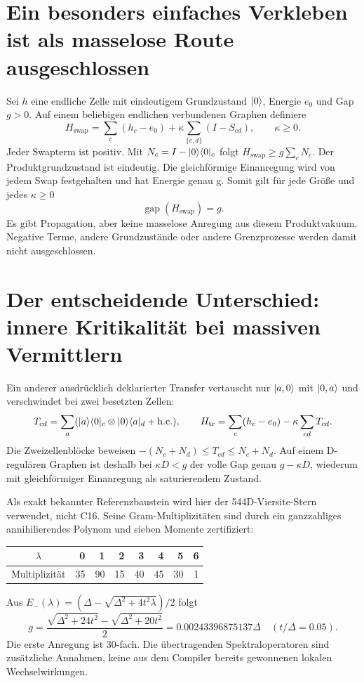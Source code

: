 \section{Ein besonders einfaches Verkleben ist als masselose Route ausgeschlossen}
Sei $h$ eine endliche Zelle mit eindeutigem Grundzustand $\lvert0\rangle$, Energie $e_0$ und Gap $g>0$. Auf einem beliebigen endlichen verbundenen Graphen definiere
\[
H_\mathrm{swap}=\sum_c(h_c-e_0)+\kappa\sum_{\{c,d\}}(I-S_{cd}),\qquad\kappa\ge0.
\]
Jeder Swapterm ist positiv. Mit $N_c=I-\lvert0\rangle\langle0\rvert_c$ folgt $H_\mathrm{swap}\ge g\sum_cN_c$. Der Produktgrundzustand ist eindeutig. Die gleichförmige Einanregung wird von jedem Swap festgehalten und hat Energie genau g. Somit gilt für jede Größe und jedes $\kappa\ge0$
\[
\boxed{\operatorname{gap}(H_\mathrm{swap})=g.}
\]
Es gibt Propagation, aber keine masselose Anregung aus diesem Produktvakuum. Negative Terme, andere Grundzustände oder andere Grenzprozesse werden damit nicht ausgeschlossen.

\section{Der entscheidende Unterschied: innere Kritikalität bei massiven Vermittlern}
Ein anderer ausdrücklich deklarierter Transfer vertauscht nur $\lvert a,0\rangle$ mit $\lvert0,a\rangle$ und verschwindet bei zwei besetzten Zellen:
\[
T_{cd}=\sum_a(\lvert a\rangle\langle0\rvert_c\otimes\lvert0\rangle\langle a\rvert_d+\mathrm{h.c.}),
\qquad H_\mathrm{tr}=\sum_c(h_c-e_0)-\kappa\sum_{cd}T_{cd}.
\]
Die Zweizellenblöcke beweisen $-(N_c+N_d)\le T_{cd}\le N_c+N_d$. Auf einem D-regulären Graphen ist deshalb bei $\kappa D<g$ der volle Gap genau $g-\kappa D$, wiederum mit gleichförmiger Einanregung als saturierendem Zustand.

Als exakt bekannter Referenzbaustein wird hier der 544D-Viersite-Stern verwendet, nicht C16. Seine Gram-Multiplizitäten sind durch ein ganzzahliges annihilierendes Polynom und sieben Momente zertifiziert:

\begin{center}
\begin{tabular}{c|rrrrrrr}
$\lambda$&0&1&2&3&4&5&6\\\hline
Multiplizität&35&90&15&40&45&30&1
\end{tabular}
\end{center}

Aus $E_-(\lambda)=(\Delta-\sqrt{\Delta^2+4t^2\lambda})/2$ folgt
\[
g=\frac{\sqrt{\Delta^2+24t^2}-\sqrt{\Delta^2+20t^2}}2
=0.00243396875137\Delta\quad(t/\Delta=0.05).
\]
Die erste Anregung ist 30-fach. Die übertragenden Spektraloperatoren sind zusätzliche Annahmen, keine aus dem Compiler bereits gewonnenen lokalen Wechselwirkungen.

